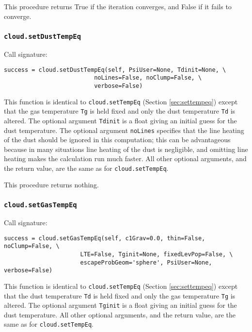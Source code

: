 \documentclass[12pt]{article}
\begin{document}
This procedure returns True if the iteration converges, and False if it fails to converge.

\subsubsection{\texttt{cloud.setDustTempEq}}

Call signature:

\begin{verbatim}
success = cloud.setDustTempEq(self, PsiUser=None, Tdinit=None, \
                          noLines=False, noClump=False, \
                          verbose=False)
\end{verbatim}

This function is identical to \verb=cloud.setTempEq= (Section \ref{sec:settempeq}) except that the gas temperature \verb=Tg= is held fixed and only the dust temperature \verb=Td= is altered. The optional argument \verb=Tdinit= is a float giving an initial guess for the dust temperature. The optional argument \verb=noLines= specifies that the line heating of the dust should be ignored in this computation; this can be advantageous because in many situations line heating of the dust is negligible, and omitting line heating makes the calculation run much faster. All other optional arguments, and the return value, are the same as for \verb=cloud.setTempEq=.

This procedure returns nothing.

\subsubsection{\texttt{cloud.setGasTempEq}}

Call signature:

\begin{verbatim}
success = cloud.setGasTempEq(self, c1Grav=0.0, thin=False, noClump=False, \
                      LTE=False, Tginit=None, fixedLevPop=False, \
                      escapeProbGeom='sphere', PsiUser=None, verbose=False)
\end{verbatim}

This function is identical to \verb=cloud.setTempEq= (Section \ref{sec:settempeq}) except that the dust temperature \verb=Td= is held fixed and only the gas temperature \verb=Tg= is altered. The optional argument \verb=Tginit= is a float giving an initial guess for the dust temperature. All other optional arguments, and the return value, are the same as for \verb=cloud.setTempEq=.
\end{document}
